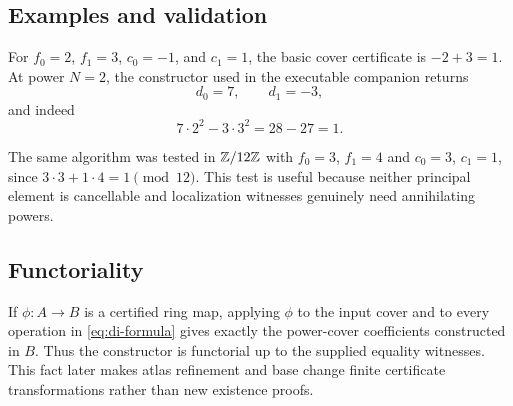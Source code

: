 \subsection{Examples and validation}

For $f_0=2$, $f_1=3$, $c_0=-1$, and $c_1=1$, the basic cover certificate is
$-2+3=1$.  At power $N=2$, the constructor used in the executable companion returns
\[
                   d_0=7,\qquad d_1=-3,
\]
and indeed
\[
                    7\cdot2^2-3\cdot3^2=28-27=1.
\]

The same algorithm was tested in $\mathbb Z/12\mathbb Z$ with $f_0=3$, $f_1=4$ and
$c_0=3$, $c_1=1$, since $3\cdot3+1\cdot4=1\pmod {12}$.  This test is useful because neither
principal element is cancellable and localization witnesses genuinely need annihilating powers.

\subsection{Functoriality}

If $\phi:A\to B$ is a certified ring map, applying $\phi$ to the input cover and to every operation
in \eqref{eq:di-formula} gives exactly the power-cover coefficients constructed in $B$.  Thus the
constructor is functorial up to the supplied equality witnesses.  This fact later makes atlas
refinement and base change finite certificate transformations rather than new existence proofs.
